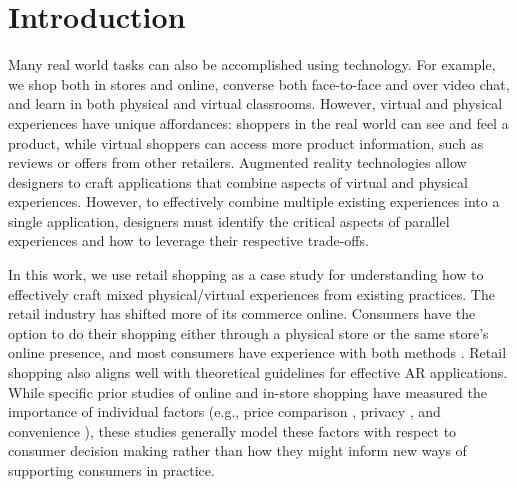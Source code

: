 \section{Introduction}

Many real world tasks can also be accomplished using technology.  For example, we shop both in stores and online, converse both face-to-face and over video chat, and learn in both physical and virtual classrooms.  However, virtual and physical experiences have unique affordances: shoppers in the real world can see and feel a product, while virtual shoppers can access more product information, such as reviews or offers from other retailers. Augmented reality technologies allow designers to craft applications that combine aspects of virtual and physical experiences. However, to effectively combine multiple existing experiences into a single application, designers must identify the critical aspects of parallel experiences and how to leverage their respective trade-offs. 

In this work, we use retail shopping as a case study for understanding how to effectively craft mixed physical/virtual experiences from existing practices. The retail industry has shifted more of its commerce online.  Consumers have the option to do their shopping either through a physical store or the same store's online presence, and most consumers have experience with both methods \cite{}.  Retail shopping also aligns well with theoretical guidelines for effective AR applications.    While specific prior studies of online and in-store shopping have measured the importance of individual factors (e.g., price comparison \cite{karlsson2005price}, privacy \cite{miyazaki2001consumer}, and convenience \cite{bednarz2010perceptions}), these studies generally model these factors with respect to consumer decision making rather than how they might inform new ways of supporting consumers in practice. 

